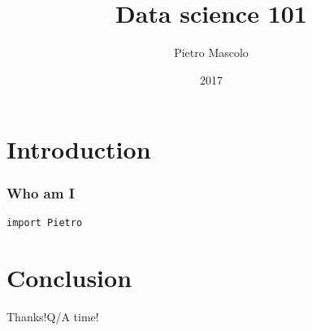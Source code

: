 \documentclass[11pt]{beamer}
\title[Data Science]{\textbf{Data science 101}}
\institute[Optum]{Optum Ireland - UnitedHealth Group}
\author[]{Pietro Mascolo}
\date{2017}
\begin{document}
\maketitle

\section{Introduction}
\begin{frame}
\frametitle{Who am I}
\texttt{import Pietro}

\end{frame}


\section{Conclusion}
\begin{frame}
\begin{block}{Thanks!}{Q/A time!}
\end{block}
\end{frame}
\end{document}
